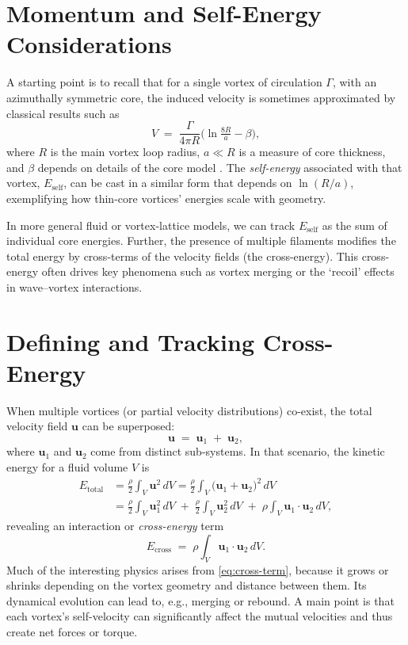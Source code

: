 \documentclass[11pt]{article}
\begin{document}
\section{Momentum and Self-Energy Considerations}
\label{sec:momentum}
A starting point is to recall that for a single vortex of circulation $\Gamma$, with an
azimuthally symmetric core, the induced velocity is sometimes approximated by
classical results such as
\begin{equation}
   V \;=\; \frac{\Gamma}{4 \pi R}
   \bigl(\ln \tfrac{8 R}{a} - \beta \bigr),
\end{equation}
where $R$ is the main vortex loop radius, $a \ll R$ is a measure of core thickness,
and $\beta$ depends on details of the core model \cite{Saffman1992}. The
\emph{self-energy} associated with that vortex, $E_{\text{self}}$, can be cast in a
similar form that depends on $\ln(R/a)$, exemplifying how thin-core vortices'
energies scale with geometry.

In more general fluid or vortex-lattice models, we can track $E_{\text{self}}$ as the
sum of individual core energies. Further, the presence of multiple filaments modifies
the total energy by cross-terms of the velocity fields (the cross-energy). This
cross-energy often drives key phenomena such as vortex merging or the `recoil'
effects in wave--vortex interactions.

\section{Defining and Tracking Cross-Energy}
\label{sec:cross}
When multiple vortices (or partial velocity distributions) co-exist, the total velocity
field $\mathbf{u}$ can be superposed:
\begin{equation}
   \mathbf{u} \;=\; \mathbf{u}_1 \;+\;\mathbf{u}_2,
\end{equation}
where $\mathbf{u}_1$ and $\mathbf{u}_2$ come from distinct sub-systems. In that
scenario, the kinetic energy for a fluid volume $V$ is
\begin{align}
   E_{\text{total}} &= \frac{\rho}{2} \int_V \mathbf{u}^2 \,dV
   = \frac{\rho}{2} \int_V \bigl(\mathbf{u}_1 + \mathbf{u}_2 \bigr)^2\, dV \\
   &= \frac{\rho}{2} \int_V \mathbf{u}_1^2 \,dV \;+\;\frac{\rho}{2} \int_V \mathbf{u}_2^2 \, dV
   \;+\;\rho \int_V \mathbf{u}_1 \cdot \mathbf{u}_2 \, dV,
\end{align}
revealing an interaction or \emph{cross-energy} term
\begin{equation}
   E_{\text{cross}} \;=\; \rho \int_V \mathbf{u}_1 \cdot \mathbf{u}_2 \, dV.
   \label{eq:cross-term}
\end{equation}
Much of the interesting physics arises from \eqref{eq:cross-term}, because it
grows or shrinks depending on the vortex geometry and distance between them.
Its dynamical evolution can lead to, e.g., merging or rebound. A main point is that
each vortex's self-velocity can significantly affect the mutual velocities and thus
create net forces or torque.
\end{document}
